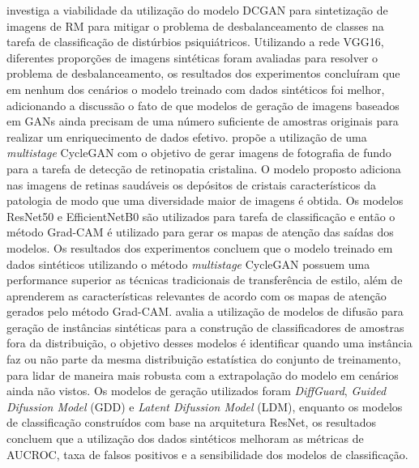  investiga a viabilidade da utilização do modelo DCGAN para sintetização de imagens de RM para mitigar o problema de desbalanceamento de classes na tarefa de classificação de distúrbios psiquiátricos. Utilizando a rede VGG16, diferentes proporções de imagens sintéticas foram avaliadas para resolver o problema de desbalanceamento, os resultados dos experimentos concluíram que em nenhum dos cenários o modelo treinado com dados sintéticos foi melhor, adicionando a discussão o fato de que modelos de geração de imagens baseados em GANs ainda precisam de uma número suficiente de amostras originais para realizar um enriquecimento de dados efetivo.
 propõe a utilização de uma \textit{multistage} CycleGAN  com o objetivo de gerar imagens de fotografia de fundo para a tarefa de detecção de retinopatia cristalina. O modelo proposto adiciona nas imagens de retinas saudáveis os depósitos de cristais característicos da patologia de modo que uma diversidade maior de imagens é obtida. Os modelos ResNet50 e EfficientNetB0 são utilizados para tarefa de classificação e então o método Grad-CAM é utilizado para gerar os mapas de atenção das saídas dos modelos. Os resultados dos experimentos concluem que o modelo treinado em dados sintéticos utilizando o método \textit{multistage} CycleGAN possuem uma performance superior as técnicas tradicionais de transferência de estilo, além de aprenderem as características relevantes de acordo com os mapas de atenção gerados pelo método Grad-CAM.
 avalia a utilização de modelos de difusão para geração de instâncias sintéticas para a construção de classificadores de amostras fora da distribuição, o objetivo desses modelos é identificar quando uma instância faz ou não parte da mesma distribuição estatística do conjunto de treinamento, para lidar de maneira mais robusta com a extrapolação do modelo em cenários ainda não vistos. Os modelos de geração utilizados foram \textit{DiffGuard}, \textit{Guided Difussion Model} (GDD) e \textit{Latent Difussion Model} (LDM), enquanto os modelos de classificação construídos com base na arquitetura ResNet, os resultados concluem que a utilização dos dados sintéticos melhoram as métricas de AUCROC, taxa de falsos positivos e a sensibilidade dos modelos de classificação.
